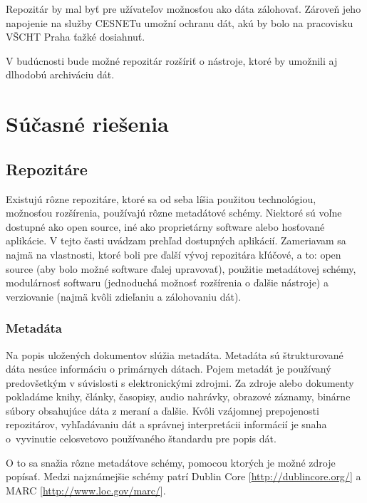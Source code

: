 \documentclass[thesis=M,slovak]{FITthesis}[2013/05/06]
\begin{document}
Repozitár by mal byť pre užívateľov možnosťou ako dáta zálohovať. Zároveň jeho napojenie na služby CESNETu umožní ochranu dát, akú by bolo na pracovisku VŠCHT Praha ťažké dosiahnuť.

V budúcnosti bude možné repozitár rozšíriť o nástroje, ktoré by umožnili aj dlhodobú archiváciu dát.

\chapter{Súčasné riešenia}
\section{Repozitáre}
Existujú rôzne repozitáre, ktoré sa od seba líšia použitou technológiou, možnosťou rozšírenia, používajú rôzne metadátové schémy. Niektoré sú voľne dostupné ako open source, iné ako proprietárny software alebo hosťované aplikácie. V tejto časti uvádzam prehľad dostupných aplikácií. Zameriavam sa najmä na vlastnosti, ktoré boli pre ďalší vývoj repozitára kľúčové, a to: open source (aby bolo možné software ďalej upravovať), použitie metadátovej schémy, modulárnosť softwaru (jednoduchá možnosť rozšírenia o ďalšie nástroje) a verziovanie (najmä kvôli zdieľaniu a zálohovaniu dát).


\subsection{Metadáta}
Na popis uložených dokumentov slúžia metadáta. Metadáta sú štrukturované dáta nesúce informáciu o primárnych dátach. Pojem metadát je používaný predovšetkým v súvislosti s elektronickými zdrojmi. \cite{iso8459-5} Za zdroje alebo dokumenty pokladáme knihy, články, časopisy, audio nahrávky, obrazové záznamy, binárne súbory obsahujúce dáta z meraní a ďalšie. Kvôli vzájomnej prepojenosti repozitárov, vyhľadávaniu dát a správnej interpretácii informácií je snaha o~vyvinutie celosvetovo používaného štandardu pre popis dát. 

O to sa snažia rôzne metadátove schémy, pomocou ktorých je možné zdroje popísať. Medzi najznámejšie schémy patrí Dublin Core [\url{http://dublincore.org/}] a MARC [\url{http://www.loc.gov/marc/}].
\end{document}
